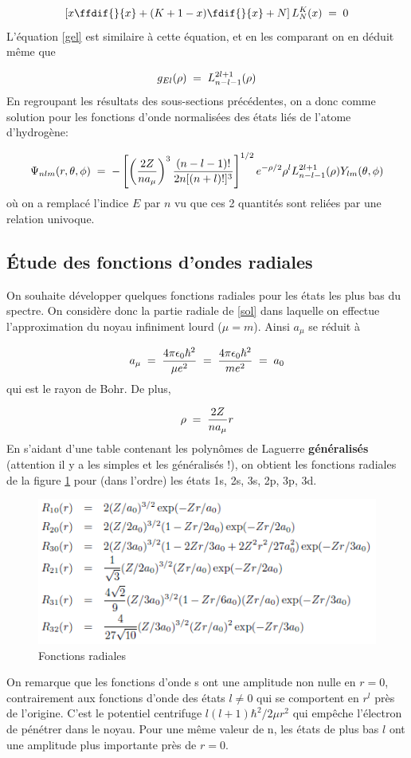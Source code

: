 \begin{equation}
    \left[x\ffdif{}{x}+(K+1-x)\fdif{}{x}+N\right] L_{N}^{K}(x)\eq 0
\end{equation}
L'équation \eqref{gel} est similaire à cette équation, et en les comparant on en déduit même que

\[
    g_{El}(\rho)\; = \; L_{n-l-1}^{2l+1}(\rho)
\]
En regroupant les résultats des sous-sections précédentes, on a donc comme solution pour les fonctions d'onde normalisées des états liés de l'atome d'hydrogène:

\begin{equation}
    \Psi_{nlm}(r,\theta,\phi)\; = \; -\left[\left(\dfrac{2Z}{na_{\mu}}\right)^3\dfrac{(n-l-1)!}{2n[(n+l)!]^3}\right]^{1/2}e^{-\rho/2}\rho^l L_{n-l-1}^{2l+1}(\rho)Y_{lm}(\theta,\phi)
    \label{sol}
\end{equation}
où on a remplacé l'indice $E$ par $n$ vu que ces 2 quantités sont reliées par une relation univoque.


\subsection{Étude des fonctions d'ondes radiales}
On souhaite développer quelques fonctions radiales pour les états les plus bas du spectre. On considère donc la partie radiale de \eqref{sol} dans laquelle on effectue l'approximation du noyau infiniment lourd ($\mu=m$). Ainsi $a_\mu$ se réduit à

\[
    a_{\mu}\; = \; \dfrac{4\pi\epsilon_0\hbar^2}{\mu e^2}\; = \; \dfrac{4\pi\epsilon_0\hbar^2}{me^2}\; = \;  a_0
\]
qui est le rayon de Bohr. De plus,

\[
    \rho\; = \; \dfrac{2Z}{n a_{\mu}}r
\]
En s'aidant d'une table contenant les polynômes de Laguerre \textbf{généralisés} (attention il y a les simples et les généralisés !), on obtient les fonctions radiales de la figure \ref{fig:foncrad} pour (dans l'ordre) les états 1s, 2s, 3s, 2p, 3p, 3d.

\begin{figure}[htp]
    \centering
    \includegraphics{Images2/foncrad.PNG}
    \caption{Fonctions radiales}
    \label{fig:foncrad}
\end{figure}
On remarque que les fonctions d'onde s ont une amplitude non nulle en $r = 0$, contrairement aux fonctions
d'onde des états $l\neq 0$ qui se comportent en $r^l$ près de l'origine. C'est le potentiel centrifuge $l(l+1)\hbar^2/2\mu r^2$ qui empêche l'électron de pénétrer dans le noyau. Pour une même valeur de n, les états de plus bas $l$ ont une amplitude plus importante près de $r = 0$.

